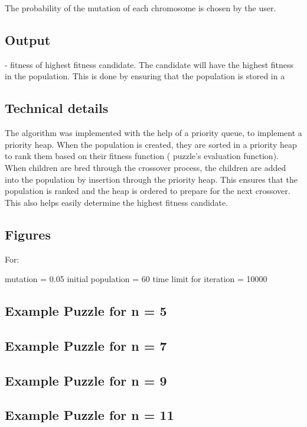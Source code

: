\documentclass{report}
\begin{document}
The probability of the mutation of each chromosome is chosen by the user.	


\subsection{Output}
	- fitness of highest fitness candidate.
The candidate will have the highest fitness in the population. This is done by ensuring that the population is stored in a 


\subsection{Technical details}
The algorithm was implemented with the help of a priority queue, to implement a priority heap. When the population is created, they are sorted in a priority heap to rank them based on their fitness function ( puzzle's evaluation function). When children are bred through the crossover process, the children are added into the population by insertion through the priority heap. This ensures that the population is ranked and the heap is ordered to prepare for the next crossover. This also helps easily determine the highest fitness candidate.

\subsection{Figures}
For:

mutation = 0.05
initial population = 60
time limit for iteration = 10000



\subsection{Example Puzzle for n = 5}

\subsection{Example Puzzle for n = 7}

\subsection{Example Puzzle for n = 9}

\subsection{Example Puzzle for n = 11}
\end{document}
